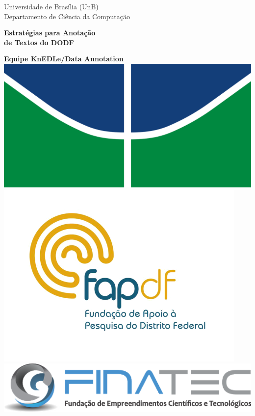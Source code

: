 \documentclass[brazil,14]{beamer}
\begin{document}
\begin{frame}[plain]{}
\begin{center}
 Universidade de Brasília (UnB)\\
 Departamento de Ciência da Computação\\
\vspace{0.75cm}
\begin{block}{ }
\begin{center}
\vspace{0.15cm}
\Large{ {\bf Estratégias para Anotação}}\\
\Large{ {\bf de Textos do DODF}}\\
\vspace{0.15cm}
\end{center}
\end{block}
\vspace{0.4cm}
{\bf Equipe KnEDLe/Data Annotation}\\
\vspace{0.4cm}
\vspace{0.25cm}
\includegraphics[width=0.2\linewidth]{figs/unb.png} \hspace{1cm}
\includegraphics[width=0.2\linewidth]{figs/logo_fapdf.png} \hspace{1cm}
\includegraphics[width=0.2\linewidth]{figs/logo_finatec.png}
\end{center}
\end{frame}
\end{document}

